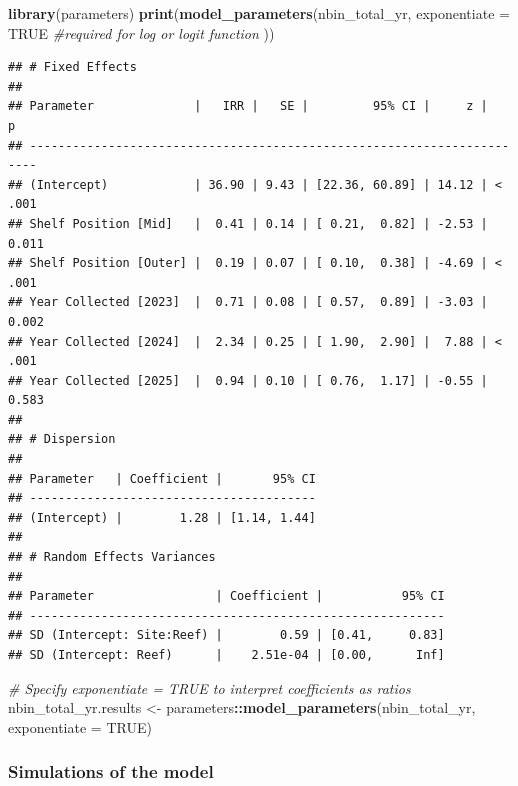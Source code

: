 \documentclass[
]{article}
\newenvironment{Shaded}{\begin{snugshade}}{\end{snugshade}}
\newcommand{\AttributeTok}[1]{\textcolor[rgb]{0.13,0.29,0.53}{#1}}
\newcommand{\CommentTok}[1]{\textcolor[rgb]{0.56,0.35,0.01}{\textit{#1}}}
\newcommand{\ConstantTok}[1]{\textcolor[rgb]{0.56,0.35,0.01}{#1}}
\newcommand{\FunctionTok}[1]{\textcolor[rgb]{0.13,0.29,0.53}{\textbf{#1}}}
\newcommand{\NormalTok}[1]{#1}
\newcommand{\OtherTok}[1]{\textcolor[rgb]{0.56,0.35,0.01}{#1}}
\newcommand{\SpecialCharTok}[1]{\textcolor[rgb]{0.81,0.36,0.00}{\textbf{#1}}}
\begin{document}
\begin{Shaded}
\begin{Highlighting}[]
\FunctionTok{library}\NormalTok{(parameters)}
\FunctionTok{print}\NormalTok{(}\FunctionTok{model\_parameters}\NormalTok{(nbin\_total\_yr,}
                       \AttributeTok{exponentiate =} \ConstantTok{TRUE} \CommentTok{\#required for log or logit function}
\NormalTok{                       ))}
\end{Highlighting}
\end{Shaded}

\begin{verbatim}
## # Fixed Effects
## 
## Parameter              |   IRR |   SE |         95% CI |     z |      p
## -----------------------------------------------------------------------
## (Intercept)            | 36.90 | 9.43 | [22.36, 60.89] | 14.12 | < .001
## Shelf Position [Mid]   |  0.41 | 0.14 | [ 0.21,  0.82] | -2.53 | 0.011 
## Shelf Position [Outer] |  0.19 | 0.07 | [ 0.10,  0.38] | -4.69 | < .001
## Year Collected [2023]  |  0.71 | 0.08 | [ 0.57,  0.89] | -3.03 | 0.002 
## Year Collected [2024]  |  2.34 | 0.25 | [ 1.90,  2.90] |  7.88 | < .001
## Year Collected [2025]  |  0.94 | 0.10 | [ 0.76,  1.17] | -0.55 | 0.583 
## 
## # Dispersion
## 
## Parameter   | Coefficient |       95% CI
## ----------------------------------------
## (Intercept) |        1.28 | [1.14, 1.44]
## 
## # Random Effects Variances
## 
## Parameter                 | Coefficient |           95% CI
## ----------------------------------------------------------
## SD (Intercept: Site:Reef) |        0.59 | [0.41,     0.83]
## SD (Intercept: Reef)      |    2.51e-04 | [0.00,      Inf]
\end{verbatim}

\begin{Shaded}
\begin{Highlighting}[]
\CommentTok{\# Specify \textquotesingle{}exponentiate = TRUE\textquotesingle{} to interpret coefficients as ratios}
\NormalTok{nbin\_total\_yr.results }\OtherTok{\textless{}{-}}\NormalTok{ parameters}\SpecialCharTok{::}\FunctionTok{model\_parameters}\NormalTok{(nbin\_total\_yr, }\AttributeTok{exponentiate =} \ConstantTok{TRUE}\NormalTok{) }
\end{Highlighting}
\end{Shaded}

\subsubsection{Simulations of the model}\label{simulations-of-the-model}
\end{document}
